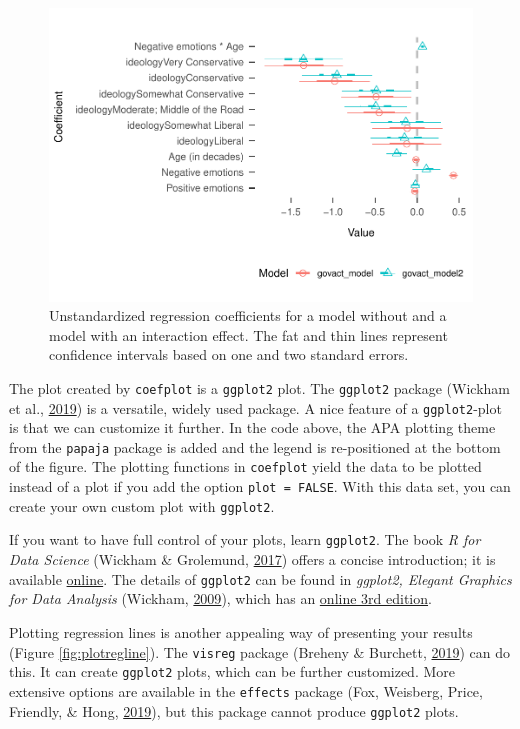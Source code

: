 \documentclass[doc,floatsintext]{apa6}
\begin{document}
\begin{figure}[H]

\centering
\includegraphics[width=12cm]{HelpMyCollaboratorUsesR_files/figure-latex/coefplot-1.pdf}
\caption{\label{fig:coefplot}Unstandardized regression coefficients for a
model without and a model with an interaction effect. The fat and thin
lines represent confidence intervals based on one and two standard
errors.}
\end{figure}

The plot created by \texttt{coefplot} is a \texttt{ggplot2} plot. The
\texttt{ggplot2} package (Wickham et al.,
\protect\hyperlink{ref-R-ggplot2}{2019}) is a versatile, widely used
package. A nice feature of a \texttt{ggplot2}-plot is that we can
customize it further. In the code above, the APA plotting theme from the
\texttt{papaja} package is added and the legend is re-positioned at the
bottom of the figure. The plotting functions in \texttt{coefplot} yield
the data to be plotted instead of a plot if you add the option
\texttt{plot\ =\ FALSE}. With this data set, you can create your own
custom plot with \texttt{ggplot2}.

If you want to have full control of your plots, learn \texttt{ggplot2}.
The book \emph{R for Data Science} (Wickham \& Grolemund,
\protect\hyperlink{ref-WickhamDataScienceImport2017}{2017}) offers a
concise introduction; it is available
\href{https://r4ds.had.co.nz/data-visualisation.html}{online}. The
details of \texttt{ggplot2} can be found in \emph{ggplot2, Elegant
Graphics for Data Analysis} (Wickham,
\protect\hyperlink{ref-wickhamGgplot2ElegantGraphics2009}{2009}), which
has an \href{https://ggplot2-book.org/}{online 3rd edition}.

Plotting regression lines is another appealing way of presenting your
results (Figure \ref{fig:plotregline}). The \texttt{visreg} package
(Breheny \& Burchett, \protect\hyperlink{ref-R-visreg}{2019}) can do
this. It can create \texttt{ggplot2} plots, which can be further
customized. More extensive options are available in the \texttt{effects}
package (Fox, Weisberg, Price, Friendly, \& Hong,
\protect\hyperlink{ref-R-effects}{2019}), but this package cannot
produce \texttt{ggplot2} plots.
\end{document}
